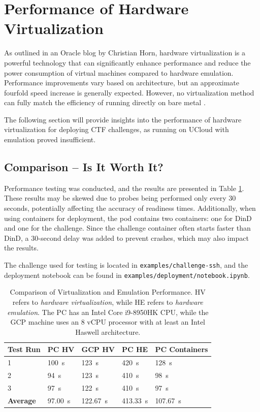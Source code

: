 \section{Performance of Hardware Virtualization}
As outlined in an Oracle blog by Christian Horn, hardware virtualization is a powerful technology that can significantly enhance performance and reduce the power consumption of virtual machines compared to hardware emulation. Performance improvements vary based on architecture, but an approximate fourfold speed increase is generally expected. However, no virtualization method can fully match the efficiency of running directly on bare metal \parencite{horn2025virtualization}.

The following section will provide insights into the performance of hardware virtualization for deploying CTF challenges, as running on UCloud with emulation proved insufficient.

\subsection{Comparison -- Is It Worth It?}
Performance testing was conducted, and the results are presented in Table \ref{table:performance}. These results may be skewed due to probes being performed only every 30 seconds, potentially affecting the accuracy of readiness times. Additionally, when using containers for deployment, the pod contains two containers: one for DinD and one for the challenge. Since the challenge container often starts faster than DinD, a 30-second delay was added to prevent crashes, which may also impact the results.

The challenge used for testing is located in \texttt{examples/challenge-ssh}, and the deployment notebook can be found in \texttt{examples/deployment/notebook.ipynb}.

\begin{table}[h]
\centering
\begin{tabular}{|l|l|l|l|l|}
\hline
\textbf{Test Run} & \textbf{PC HV} & \textbf{GCP HV} & \textbf{PC HE} & \textbf{PC Containers} \\ \hline
1 & \SI{100}{\second} & \SI{123}{\second} & \SI{420}{\second} & \SI{128}{\second} \\ \hline
2 & \SI{94}{\second}  & \SI{123}{\second} & \SI{410}{\second} & \SI{98}{\second}  \\ \hline
3 & \SI{97}{\second}  & \SI{122}{\second} & \SI{410}{\second} & \SI{97}{\second}  \\ \hline \hline
\textbf{Average} & \SI{97.00}{\second} & \SI{122.67}{\second} & \SI{413.33}{\second} & \SI{107.67}{\second} \\ \hline
\end{tabular}
\caption{Comparison of Virtualization and Emulation Performance. HV refers to \textit{hardware virtualization}, while HE refers to \textit{hardware emulation}. The PC has an Intel Core i9-8950HK CPU, while the GCP machine uses an 8 vCPU processor with at least an Intel Haswell architecture.}
\label{table:performance}
\end{table}

